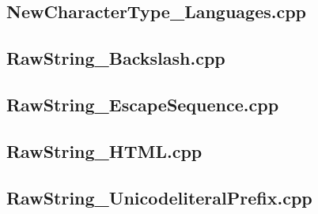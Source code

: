 \documentclass[11pt]{report}
\begin{document}
\begin{appendix}
\subsection{NewCharacterType\_Languages.cpp}
\label{NewCharacterType_Languages}


\subsection{RawString\_Backslash.cpp}
\label{RawString_Backslash}


\subsection{RawString\_EscapeSequence.cpp}
\label{RawString_EscapeSequence}


\subsection{RawString\_HTML.cpp}
\label{RawString_HTML}


\subsection{RawString\_UnicodeliteralPrefix.cpp}
\label{RawString_UnicodeliteralPrefix}


\end{appendix}
\end{document}
